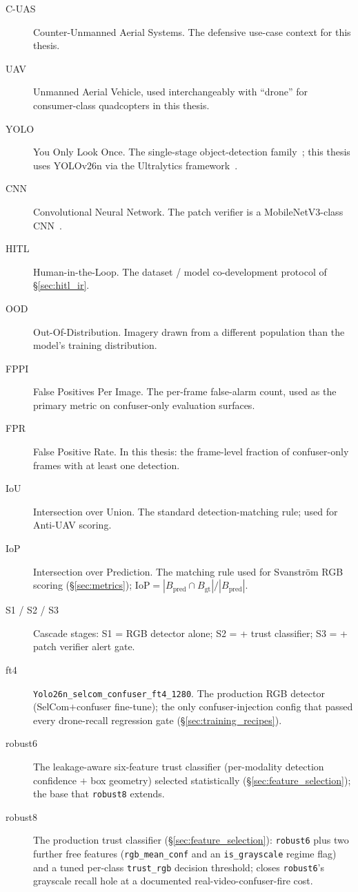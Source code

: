 \documentclass[12pt,a4paper,oneside,openright]{book}
\begin{document}
\begin{description}
    \item[C-UAS] Counter-Unmanned Aerial Systems. The defensive use-case context for this thesis.
    \item[UAV] Unmanned Aerial Vehicle, used interchangeably with ``drone'' for consumer-class quadcopters in this thesis.
    \item[YOLO] You Only Look Once. The single-stage object-detection family~\cite{redmon2016yolo}; this thesis uses YOLOv26n via the Ultralytics framework~\cite{ultralytics2024}.
    \item[CNN] Convolutional Neural Network. The patch verifier is a MobileNetV3-class CNN~\cite{howard2019mobilenetv3}.
    \item[HITL] Human-in-the-Loop. The dataset / model co-development protocol of \S\ref{sec:hitl_ir}.
    \item[OOD] Out-Of-Distribution. Imagery drawn from a different population than the model's training distribution.
    \item[FPPI] False Positives Per Image. The per-frame false-alarm count, used as the primary metric on confuser-only evaluation surfaces.
    \item[FPR] False Positive Rate. In this thesis: the frame-level fraction of confuser-only frames with at least one detection.
    \item[IoU] Intersection over Union. The standard detection-matching rule; used for Anti-UAV scoring.
    \item[IoP] Intersection over Prediction. The matching rule used for Svanstr\"om RGB scoring (\S\ref{sec:metrics}); $\text{IoP} = |B_\text{pred} \cap B_\text{gt}| / |B_\text{pred}|$.
    \item[S1 / S2 / S3] Cascade stages: S1 = RGB detector alone; S2 = + trust classifier; S3 = + patch verifier alert gate.
    \item[ft4] \texttt{Yolo26n\_selcom\_confuser\_ft4\_1280}. The production RGB detector (SelCom$+$confuser fine-tune); the only confuser-injection config that passed every drone-recall regression gate (\S\ref{sec:training_recipes}).
    \item[robust6] The leakage-aware six-feature trust classifier (per-modality detection confidence $+$ box geometry) selected statistically (\S\ref{sec:feature_selection}); the base that \texttt{robust8} extends.
    \item[robust8] The production trust classifier (\S\ref{sec:feature_selection}): \texttt{robust6} plus two further free features (\texttt{rgb\_mean\_conf} and an \texttt{is\_grayscale} regime flag) and a tuned per-class \texttt{trust\_rgb} decision threshold; closes \texttt{robust6}'s grayscale recall hole at a documented real-video-confuser-fire cost.

\end{description}
\end{document}
